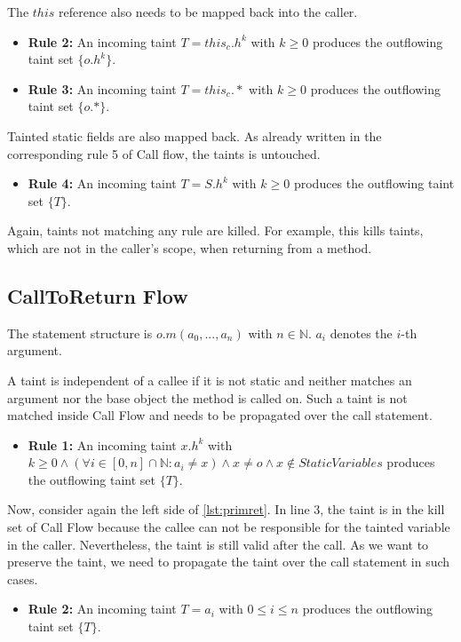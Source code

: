 \documentclass[../draft.tex]{subfiles}
\begin{document}
    The $\mathit{this}$ reference also needs to be mapped back into the caller.
    \begin{itemize}
        \item[] \textbf{Rule 2:} An incoming taint $T = \mathit{this}_c.h^k$ with $k \geq 0$ produces the outflowing taint set $\{o.h^k\}$.
        \item[] \textbf{Rule 3:} An incoming taint $T = \mathit{this}_c.*$ with $k \geq 0$ produces the outflowing taint set $\{o.*\}$.
    \end{itemize}

    Tainted static fields are also mapped back. As already written in the corresponding rule 5 of Call flow, the taints is untouched.
    \begin{itemize}
        \item[] \textbf{Rule 4:} An incoming taint $T = S.h^k$ with $k \geq 0$ produces the outflowing taint set $\{T\}$.
    \end{itemize}

    Again, taints not matching any rule are killed.
    For example, this kills taints, which are not in the caller's scope, when returning from a method.

    \subsection{CallToReturn Flow}
    The statement structure is $o.m(a_0, ..., a_n)$ with $n \in \mathbb{N}$.
    $a_i$ denotes the $i$-th argument.

    A taint is independent of a callee if it is not static and neither matches an argument nor the base object the method is called on.
    Such a taint is not matched inside Call Flow and needs to be propagated over the call statement.
    \begin{itemize}
        \item[] \textbf{Rule 1:} An incoming taint $x.h^k$ with $k \geq 0 \land \left(\forall i \in [0, n] \cap \mathbb{N}: a_i \neq x\right) \land x \neq o \land x \notin \mathit{StaticVariables}$ produces the outflowing taint set $\{T\}$.
    \end{itemize}

    Now, consider again the left side of \autoref{lst:primret}.
    In line 3, the  taint is in the kill set of Call Flow because the callee can not be responsible for the tainted variable in the caller.
    Nevertheless, the taint is still valid after the call.
    As we want to preserve the taint, we need to propagate the taint over the call statement in such cases.
    \begin{itemize}
        \item[] \textbf{Rule 2:} An incoming taint $T = a_i$ with $0 \leq i \leq n$ produces the outflowing taint set $\{T\}$.
    \end{itemize}
\end{document}
